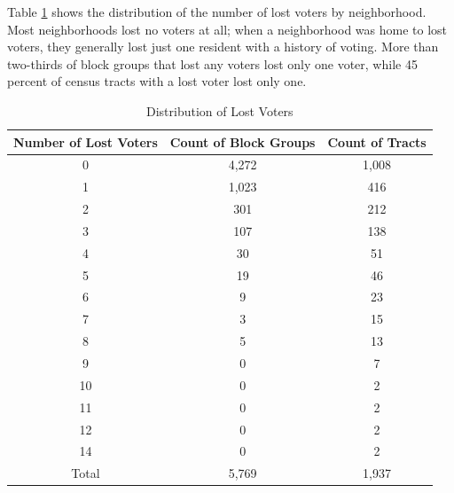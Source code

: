 \documentclass[12pt,]{article}
\begin{document}
Table \ref{tab:nhood-dist} shows the distribution of the number of lost voters by neighborhood. Most neighborhoods lost no voters at all; when a neighborhood was home to lost voters, they generally lost just one resident with a history of voting. More than two-thirds of block groups that lost any voters lost only one voter, while 45 percent of census tracts with a lost voter lost only one.

\begin{table}[H]

\caption{\label{tab:distribution-lost}\label{tab:nhood-dist} Distribution of Lost Voters}
\centering
\fontsize{10}{12}\selectfont
\begin{tabular}{ccc}
\toprule
Number of Lost Voters & Count of Block Groups & Count of Tracts\\
\midrule
0 & 4,272 & 1,008\\
1 & 1,023 & 416\\
2 & 301 & 212\\
3 & 107 & 138\\
4 & 30 & 51\\
5 & 19 & 46\\
6 & 9 & 23\\
7 & 3 & 15\\
8 & 5 & 13\\
9 & 0 & 7\\
10 & 0 & 2\\
11 & 0 & 2\\
12 & 0 & 2\\
14 & 0 & 2\\
\hline
Total & 5,769 & 1,937\\
\bottomrule
\end{tabular}
\end{table}
\end{document}
